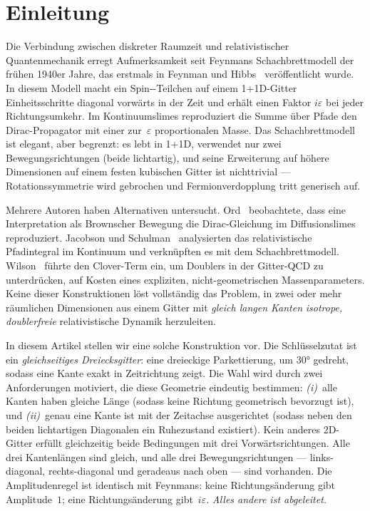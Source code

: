 \documentclass[twocolumn,showpacs,preprintnumbers,amsmath,amssymb]{revtex4-2}
\newcommand{\eps}{\varepsilon}
\begin{document}
\section{Einleitung}
\label{sec:intro}

Die Verbindung zwischen diskreter Raumzeit und relativistischer
Quantenmechanik erregt Aufmerksamkeit seit Feynmans Schachbrettmodell der
frühen 1940er Jahre, das erstmals in Feynman und Hibbs~\cite{feynman1965}
veröffentlicht wurde.
In diesem Modell macht ein Spin--Teilchen auf einem
\mbox{1\!+\!1D}-Gitter Einheitsschritte diagonal vorwärts in der Zeit und
erhält einen Faktor $i\eps$ bei jeder Richtungsumkehr.
Im Kontinuumslimes reproduziert die Summe über Pfade den Dirac-Propagator mit
einer zur~$\eps$ proportionalen Masse.
Das Schachbrettmodell ist elegant, aber begrenzt: es lebt in \mbox{1\!+\!1D},
verwendet nur zwei Bewegungsrichtungen (beide lichtartig), und seine
Erweiterung auf höhere Dimensionen auf einem festen kubischen Gitter ist
nichttrivial --- Rotationssymmetrie wird gebrochen und Fermionverdopplung
\cite{nielsen1981,susskind1977} tritt generisch auf.

Mehrere Autoren haben Alternativen untersucht.
Ord~\cite{ord1983} beobachtete, dass eine Interpretation als Brownscher
Bewegung die Dirac-Gleichung im Diffusionslimes reproduziert.
Jacobson und Schulman~\cite{jacobson1984} analysierten das relativistische
Pfadintegral im Kontinuum und verknüpften es mit dem Schachbrettmodell.
Wilson~\cite{wilson1974} führte den Clover-Term ein, um Doublers in der
Gitter-QCD zu unterdrücken, auf Kosten eines expliziten, nicht-geometrischen
Massenparameters.
Keine dieser Konstruktionen löst vollständig das Problem, in zwei oder mehr
räumlichen Dimensionen aus einem Gitter mit \emph{gleich langen Kanten}
\emph{isotrope, doublerfreie} relativistische Dynamik herzuleiten.

In diesem Artikel stellen wir eine solche Konstruktion vor.
Die Schlüsselzutat ist ein \emph{gleichseitiges Dreiecksgitter}: eine
dreieckige Parkettierung, um $30°$ gedreht, sodass eine Kante exakt in
Zeitrichtung zeigt.
Die Wahl wird durch zwei Anforderungen motiviert, die diese Geometrie
eindeutig bestimmen: \emph{(i)}~alle Kanten haben gleiche Länge (sodass
keine Richtung geometrisch bevorzugt ist), und \emph{(ii)}~genau eine
Kante ist mit der Zeitachse ausgerichtet (sodass neben den beiden lichtartigen
Diagonalen ein Ruhezustand existiert).
Kein anderes 2D-Gitter erfüllt gleichzeitig beide Bedingungen mit drei
Vorwärtsrichtungen.
Alle drei Kantenlängen sind gleich, und alle drei Bewegungsrichtungen ---
links-diagonal, rechts-diagonal und geradeaus nach oben --- sind vorhanden.
Die Amplitudenregel ist identisch mit Feynmans: keine Richtungsänderung gibt
Amplitude~$1$; eine Richtungsänderung gibt~$i\eps$.
\emph{Alles andere ist abgeleitet.}
\end{document}
